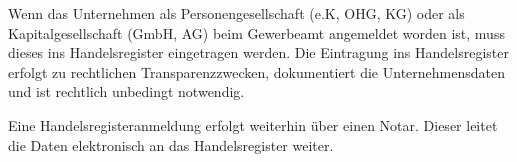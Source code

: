 
Wenn das Unternehmen als Personengesellschaft (e.K, OHG, KG) oder als Kapitalgesellschaft (GmbH, AG)
beim Gewerbeamt angemeldet worden ist, muss dieses ins Handelsregister eingetragen werden. Die Eintragung 
ins Handelsregister erfolgt zu rechtlichen Transparenzzwecken, dokumentiert die Unternehmensdaten und ist rechtlich
unbedingt notwendig.


Eine Handelsregisteranmeldung erfolgt weiterhin über einen Notar. Dieser leitet die Daten elektronisch an das Handelsregister weiter.